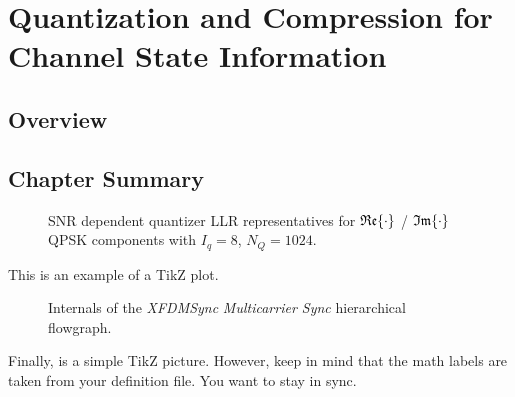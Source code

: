\chapter{Quantization and Compression for Channel State Information}
\label{chap:3}
\section{Overview}
\label{sec:ch3overview}
\section{Chapter Summary}
\label{sec:ch3summary}


\begin{figure}[tbh!]
    \centering
    
    \caption{\gls{SNR} dependent quantizer \gls{LLR} representatives for $\mathfrak{Re}\negthinspace\left\{\cdot\right\}$ / $\mathfrak{Im}\negthinspace\left\{\cdot\right\}$ \gls{QPSK} components with $I_q=8$, $N_Q=1024$.}
    \label{fig:cloudran:quantizer:llrs}
\end{figure}

This  is an example of a TikZ plot.



\begin{figure}[tbh!]
    \centering
    \caption{Internals of the \textit{XFDMSync} \textit{Multicarrier Sync} hierarchical flowgraph.}
    \label{fig:fg:sync}
\end{figure}


%     

Finally,  is a simple TikZ picture.
However, keep in mind that the math labels are taken from your definition file. You want to stay in sync.